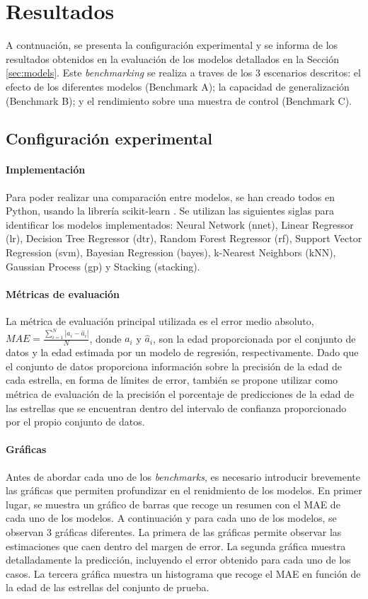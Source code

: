 \section{Resultados}
\label{sec:results}
A contnuación, se presenta la configuración experimental y se informa de los resultados obtenidos en la evaluación de los modelos detallados en la Sección \ref{sec:models}. Este \emph{benchmarking} se realiza a traves de los 3 escenarios descritos: el efecto de los diferentes modelos (Benchmark A); la capacidad de generalización (Benchmark B); y el rendimiento sobre una muestra de control (Benchmark C).

\subsection{Configuración experimental}

\paragraph{Implementación} 
Para poder realizar una comparación entre modelos, se han creado todos en Python, usando la librería scikit-learn \cite{scikit-learn}. Se utilizan las siguientes siglas para identificar los modelos implementados: Neural Network (nnet), Linear Regressor (lr), Decision Tree Regressor (dtr), Random Forest Regressor (rf), Support Vector Regression (svm), Bayesian Regression (bayes), k-Nearest Neighbors (kNN), Gaussian Process (gp) y Stacking (stacking).

\paragraph{Métricas de evaluación}
La métrica de evaluación principal utilizada es el error medio absoluto, $MAE = \frac{\sum_{i=1}^{N}|a_i-\hat{a}_i|}{N}$, donde $a_i$ y $\hat{a}_i$, son la edad proporcionada por el conjunto de datos y la edad estimada por un modelo de regresión, respectivamente. Dado que el conjunto de datos proporciona información sobre la precisión de la edad de cada estrella, en forma de límites de error, también se propone utilizar como métrica de evaluación de la precisión el porcentaje de predicciones de la edad de las estrellas que se encuentran dentro del intervalo de confianza proporcionado por el propio conjunto de datos.

\paragraph{Gráficas}
Antes de abordar cada uno de los \emph{benchmarks}, es necesario introducir brevemente las gráficas que permiten profundizar en el renidmiento de los modelos. En primer lugar, se muestra un gráfico de barras que recoge un resumen con el MAE de cada uno de los modelos. A continuación y para cada uno de los modelos, se observan 3 gráficas diferentes. La primera de las gráficas permite observar las estimaciones que caen dentro del margen de error. La segunda gráfica muestra detalladamente la predicción, incluyendo el error obtenido para cada uno de los casos. La tercera gráfica muestra un histograma que recoge el MAE en función de la edad de las estrellas del conjunto de prueba.

